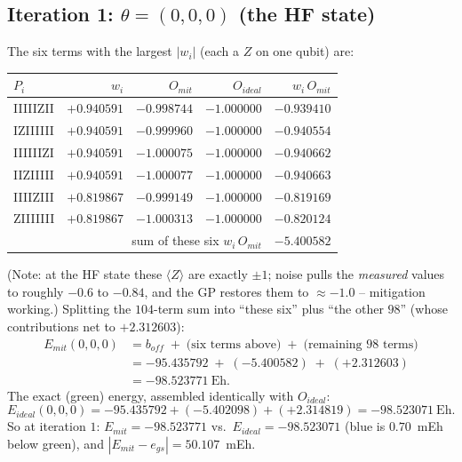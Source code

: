 \documentclass[11pt]{article}
\def\bm#1{#1}%
\def\texttt#1{#1}%
\def\mathrm#1{#1}%
\newcommand{\Emit}{E_{\mathrm{mit}}}
\newcommand{\Eideal}{E_{\mathrm{ideal}}}
\newcommand{\egs}{e_{\mathrm{gs}}}
\newcommand{\boff}{b_{\mathrm{off}}}
\begin{document}
\subsection{Iteration 1: \texorpdfstring{$\bm\theta=(0,0,0)$}{theta=(0,0,0)} (the HF state)}
The six terms with the largest $|w_i|$ (each a $Z$ on one qubit) are:

\begin{center}
\renewcommand{\arraystretch}{1.15}
\begin{tabular}{@{}lrrrr@{}}
\toprule
$P_i$ & $w_i$ & $O_{\mathrm{mit}}$ & $O_{\mathrm{ideal}}$ & $w_i\,O_{\mathrm{mit}}$ \\
\midrule
\texttt{IIIIIZII} & $+0.940591$ & $-0.998744$ & $-1.000000$ & $-0.939410$ \\
\texttt{IZIIIIII} & $+0.940591$ & $-0.999960$ & $-1.000000$ & $-0.940554$ \\
\texttt{IIIIIIZI} & $+0.940591$ & $-1.000075$ & $-1.000000$ & $-0.940662$ \\
\texttt{IIZIIIII} & $+0.940591$ & $-1.000077$ & $-1.000000$ & $-0.940663$ \\
\texttt{IIIIZIII} & $+0.819867$ & $-0.999149$ & $-1.000000$ & $-0.819169$ \\
\texttt{ZIIIIIII} & $+0.819867$ & $-1.000313$ & $-1.000000$ & $-0.820124$ \\
\midrule
\multicolumn{4}{r}{sum of these six $w_i\,O_{\mathrm{mit}}$} & $-5.400582$ \\
\bottomrule
\end{tabular}
\end{center}

\noindent
(Note: at the HF state these $\langle Z\rangle$ are exactly $\pm1$; noise pulls
the \emph{measured} values to roughly $-0.6$ to $-0.84$, and the GP restores them
to $\approx-1.0$ -- mitigation working.) Splitting the $104$-term sum into ``these
six'' plus ``the other $98$'' (whose contributions net to $+2.312603$):
\[
\begin{aligned}
\Emit(0,0,0)
&=\boff \;+\; \big(\text{six terms above}\big)\;+\;\big(\text{remaining }98\text{ terms}\big)\\
&=-95.435792 \;+\;(-5.400582)\;+\;(+2.312603)\\
&=\boxed{-98.523771~\text{Eh}.}
\end{aligned}
\]
The exact (green) energy, assembled identically with $O_{\mathrm{ideal}}$:
\[
\Eideal(0,0,0)=-95.435792+(-5.402098)+(+2.314819)=-98.523071~\text{Eh}.
\]
So at iteration $1$: $\Emit=-98.523771$ vs.\ $\Eideal=-98.523071$ (blue is
$0.70$~mEh below green), and $|\Emit-\egs|=50.107$~mEh.
\end{document}
